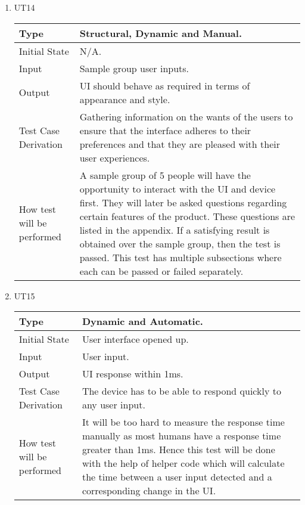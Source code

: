 \documentclass[12pt, titlepage]{article}
\begin{document}
\begin{enumerate}

\item{UT14\\}

\begin{tabular}{ |p{5cm}||p{7cm}| }
    \hline
    Type & Structural, Dynamic and Manual. \\
    \hline
    Initial State  &  N/A. \\
    \hline
    Input &   Sample group user inputs. \\
    \hline
    Output &   UI should behave as required in terms of appearance and style.  \\
    \hline
    Test Case Derivation &   Gathering information on the wants of the users to ensure that the interface adheres to their preferences and that they are pleased with their user experiences. \\
    \hline
    How test will be performed & A sample group of 5 people will have the opportunity to interact with the UI and device first. They will later be asked questions regarding certain features of the product. These questions are listed in the appendix. If a satisfying result is obtained over the sample group, then the test is passed. This test has multiple subsections where each can be passed or failed separately. \\
    \hline
\end{tabular}

\item{UT15\\}

\begin{tabular}{ |p{5cm}||p{7cm}| }
    \hline
    Type & Dynamic and Automatic. \\
    \hline
    Initial State  &  User interface opened up. \\
    \hline
    Input &   User input. \\
    \hline
    Output &   UI response within 1ms.  \\
    \hline
    Test Case Derivation &   The device has to be able to respond quickly to any user input. \\
    \hline
    How test will be performed & It will be too hard to measure the response time manually as most humans have a response time greater than 1ms. Hence this test will be done with the help of helper code which will calculate the time between a user input detected and a corresponding change in the UI. \\
    \hline
\end{tabular}


\end{enumerate}
\end{document}
